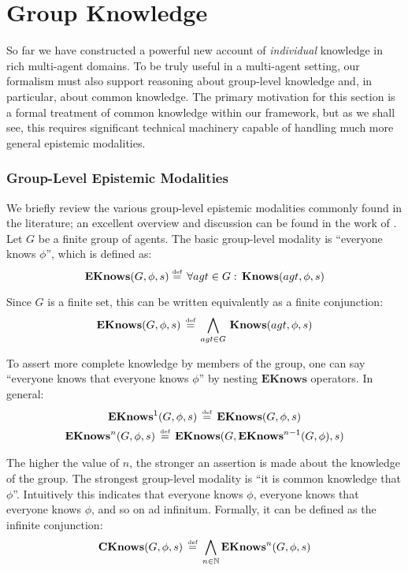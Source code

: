 


\chapter{Group Knowledge}

\label{ch:cknowledge} 

So far we have constructed a powerful new account of \emph{individual
}knowledge in rich multi-agent domains. To be truly useful in a multi-agent
setting, our formalism must also support reasoning about group-level
knowledge and, in particular, about common knowledge. The primary
motivation for this section is a formal treatment of common knowledge
within our framework, but as we shall see, this requires significant
technical machinery capable of handling much more general epistemic
modalities.


\subsection{Group-Level Epistemic Modalities}

We briefly review the various group-level epistemic modalities commonly
found in the literature; an excellent overview and discussion can
be found in the work of \citet{halpern90knowledge_distrib}. Let $G$
be a finite group of agents. The basic group-level modality is {}``everyone
knows $\phi$'', which is defined as:\[
\mathbf{EKnows}(G,\phi,s)\stackrel{\mbox{\tiny def}}{=}\,\forall agt\in G:\,\mathbf{Knows}(agt,\phi,s)\]


Since $G$ is a finite set, this can be written equivalently as a
finite conjunction:\[
\mathbf{EKnows}(G,\phi,s)\,\stackrel{\mbox{\tiny def}}{=}\,\bigwedge_{agt\in G}\,\mathbf{Knows}(agt,\phi,s)\]


To assert more complete knowledge by members of the group, one can
say {}``everyone knows that everyone knows $\phi$'' by nesting
$\mathbf{EKnows}$ operators. In general:\begin{gather*}
\mathbf{EKnows}^{1}(G,\phi,s)\,\stackrel{\mbox{\tiny def}}{=}\,\mathbf{EKnows}(G,\phi,s)\\
\mathbf{EKnows}^{n}(G,\phi,s)\,\stackrel{\mbox{\tiny def}}{=}\,\mathbf{EKnows}(G,\mathbf{EKnows}^{n-1}(G,\phi),s)\end{gather*}


The higher the value of $n$, the stronger an assertion is made about
the knowledge of the group. The strongest group-level modality is
{}``it is common knowledge that $\phi$''. Intuitively this indicates
that everyone knows $\phi$, everyone knows that everyone knows $\phi$,
and so on ad infinitum. Formally, it can be defined as the infinite
conjunction:\[
\mathbf{CKnows}(G,\phi,s)\,\stackrel{\mbox{\tiny def}}{=}\,\bigwedge_{n\in\mathbb{N}}\mathbf{EKnows}^{n}(G,\phi,s)\]


